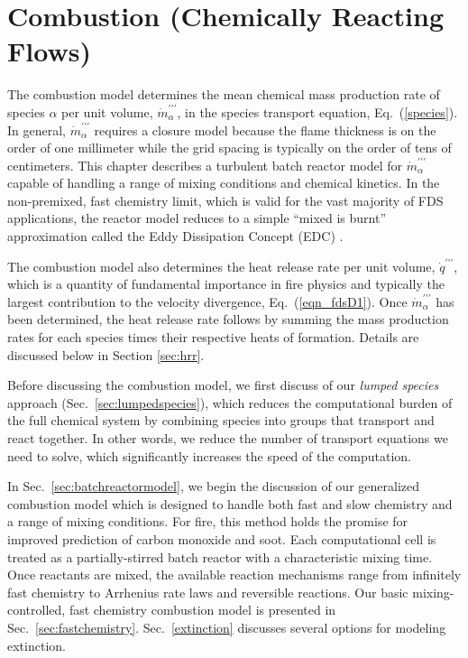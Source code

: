

\chapter{Combustion (Chemically Reacting Flows)}
\label{chapter:combustion}

\label{combustionsection}
The combustion model determines the mean chemical mass production rate of species $\alpha$ per unit volume, $\dot{m}^{\prime\prime\prime}_{\alpha}$, in the species transport equation, Eq.~(\ref{species}).  In general, $\dot{m}^{\prime\prime\prime}_{\alpha}$ requires a closure model because the flame thickness is on the order of one millimeter while the grid spacing is typically on the order of tens of centimeters.  This chapter describes a turbulent batch reactor model for $\dot{m}^{\prime\prime\prime}_{\alpha}$ capable of handling a range of mixing conditions and chemical kinetics.  In the non-premixed, fast chemistry limit, which is valid for the vast majority of FDS applications, the reactor model reduces to a simple ``mixed is burnt'' approximation called the Eddy Dissipation Concept (EDC) \cite{Magnussen:1,Poinsot:TNC}.

The combustion model also determines the heat release rate per unit volume, $\dot{q}^{\prime\prime\prime}$, which is a quantity of fundamental importance in fire physics and typically the largest contribution to the velocity divergence, Eq.~(\ref{eqn_fdsD1}).  Once $\dot{m}^{\prime\prime\prime}_{\alpha}$ has been determined, the heat release rate follows by summing the mass production rates for each species times their respective heats of formation.  Details are discussed below in Section \ref{sec:hrr}.

Before discussing the combustion model, we first discuss of our \emph{lumped species} approach (Sec.~\ref{sec:lumpedspecies}), which reduces the computational burden of the full chemical system by combining species into groups that transport and react together.  In other words, we reduce the number of transport equations we need to solve, which significantly increases the speed of the computation.

In Sec.~\ref{sec:batchreactormodel}, we begin the discussion of our generalized combustion model which is designed to handle both fast and slow chemistry and a range of mixing conditions.  For fire, this method holds the promise for improved prediction of carbon monoxide and soot. Each computational cell is treated as a partially-stirred batch reactor with a characteristic mixing time.  Once reactants are mixed, the available reaction mechanisms range from infinitely fast chemistry to Arrhenius rate laws and reversible reactions. Our basic mixing-controlled, fast chemistry combustion model is presented in Sec.~\ref{sec:fastchemistry}. Sec.~\ref{extinction} discusses several options for modeling extinction.

